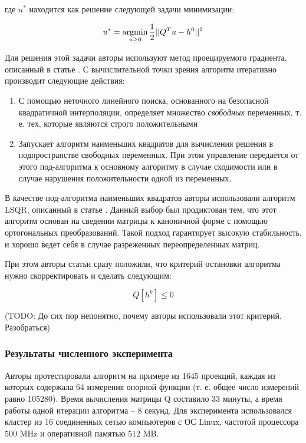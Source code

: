 \documentclass[a4paper, 12pt, titlepage]{article}
\theoremstyle{definition}
\theoremstyle{plain}
\theoremstyle{plain}
\begin{document}
где $u^{*}$ находится как решение следующей задачи минимизации:

\begin{equation}
 u^{*} = \operatornamewithlimits{argmin}_{u \geq 0}
 \frac{1}{2} ||Q^{T} u - h^{0}||^{2}
\end{equation}

Для решения этой задачи авторы используют метод проецируемого градиента,
описанный в статье \cite{journals/laa/BierlaireTT1995}. С вычислительной точки
зрения алгоритм итеративно производит следующие действия:

\begin{enumerate}
 \item С помощью неточного линейного поиска, основанного на безопасной
 квадратичной интерполяции, определяет множество \textit{свободных} переменных,
 т. е. тех, которые являются строго положительными
 \item Запускает алгоритм наименьших квадратов для вычисления решения в
 подпространстве свободных переменных. При этом управление передается от этого
 под-алгоритма к основному алгоритму в случае сходимости или в случае нарушения
 положительности одной из переменных.
\end{enumerate}

В качестве под-алгоритма наименьших квадратов авторы использовали алгоритм
LSQR, описанный в статье \cite{journals/acmtms/PaigeS1982}. Данный выбор был
продиктован тем, что этот алгоритм основан на сведении матрицы к каноничной
форме с помощью ортогональных преобразований. Такой подход гарантирует
высокую стабильность, и хорошо ведет себя в случае разреженных переопределенных
матриц.

При этом авторы статьи сразу положили, что критерий остановки алгоритма нужно
скорректировать и сделать следующим:

\begin{equation}
 Q[h^{k}] \leq 0
\end{equation}

(TODO: До сих пор непонятно, почему авторы использовали этот критерий.
Разобраться)

\subsubsection{Результаты численного эксперимента}
\label{sec:support-methods:3d-nonuniform:results}

Авторы протестировали алгоритм на примере из 1645 проекций, каждая из которых
содержала 64 измерения опорной функции (т. е. общее число измерений равно
105280). Время вычисления матрицы Q составило 33 минуты, а время работы одной
итерации алгоритма -- 8 секунд. Для эксперимента использовался кластер из 16
соединенных сетью компьютеров с ОС Linux, частотой процессора 500 MHz и
оперативной памятью 512 MB.
\end{document}
